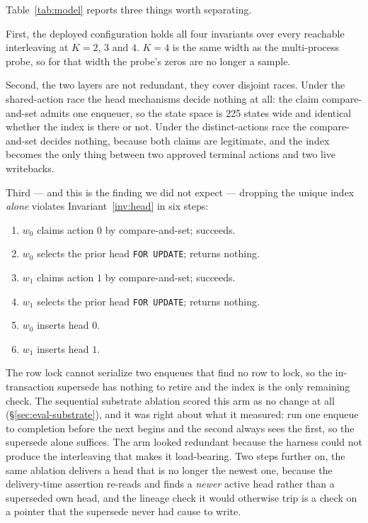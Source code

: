\documentclass[acmsmall,manuscript,review,anonymous]{acmart}
\renewcommand{\_}{\discretionary{\textunderscore}{}{\textunderscore}}
\begin{document}
Table~\ref{tab:model} reports three things worth separating.

First, the deployed configuration holds all four invariants over every reachable
interleaving at $K=2$, $3$ and $4$. $K=4$ is the same width as the
multi-process probe, so for that width the probe's zeros are no longer a sample.

Second, the two layers are not redundant, they cover disjoint races. Under the
shared-action race the head mechanisms decide nothing at all: the claim
compare-and-set admits one enqueuer, so the state space is 225 states wide and
identical whether the index is there or not. Under the distinct-actions race the
compare-and-set decides nothing, because both claims are legitimate, and the
index becomes the only thing between two approved terminal actions and two live
writebacks.

Third --- and this is the finding we did not expect --- dropping the unique index
\emph{alone} violates Invariant~\ref{inv:head} in six steps:

\begin{enumerate}\itemsep1pt
\item $w_0$ claims action $0$ by compare-and-set; succeeds.
\item $w_0$ selects the prior head \texttt{FOR UPDATE}; returns nothing.
\item $w_1$ claims action $1$ by compare-and-set; succeeds.
\item $w_1$ selects the prior head \texttt{FOR UPDATE}; returns nothing.
\item $w_0$ inserts head $0$.
\item $w_1$ inserts head $1$.
\end{enumerate}

The row lock cannot serialize two enqueues that find no row to lock, so the
in-transaction supersede has nothing to retire and the index is the only
remaining check. The sequential substrate ablation scored this arm as no change
at all (\S\ref{sec:eval-substrate}), and it was right about what it measured:
run one enqueue to completion before the next begins and the second always sees
the first, so the supersede alone suffices. The arm looked redundant because the
harness could not produce the interleaving that makes it load-bearing. Two steps
further on, the same ablation delivers a head that is no longer the newest one,
because the delivery-time assertion re-reads and finds a \emph{newer} active
head rather than a superseded own head, and the lineage check it would otherwise
trip is a check on a pointer that the supersede never had cause to write.
\end{document}
